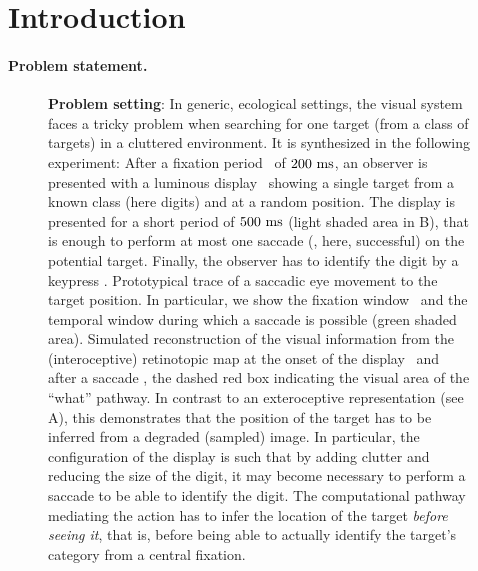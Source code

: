 \section{Introduction}
\label{sec:intro}
\paragraph{Problem statement.}
\begin{figure}[t!]%
	\caption{%
		{\bf Problem setting}: In generic, ecological settings, the visual system faces a tricky problem when searching for one target (from a class of targets) in a cluttered environment. It is synthesized in the following experiment: %
		\A After a fixation period \FIX\ of $200~\si{\milli\second}$, an observer is presented with a luminous display \DIS\ showing a single target from a known class (here digits) and at a random position. The display is presented for a short period of $500~\si{\milli\second}$ (light shaded area in B), that is enough to perform at most one saccade (\SAC , here, successful) on the potential target. Finally, the observer has to identify the digit by a keypress \ANS . %
		\B Prototypical trace of a saccadic eye movement to the target position. In particular, we show the fixation window \FIX\ and the temporal window during which a saccade is possible (green shaded area). %
		\C Simulated reconstruction of the visual information from the (interoceptive) retinotopic map at the onset of the display \DIS\ and after a saccade \SAC , the dashed red box indicating the visual area of the ``what'' pathway. In contrast to an exteroceptive representation (see A), this demonstrates that the position of the target has to be inferred from a degraded (sampled) image. In particular, the configuration of the display is such that by adding clutter and reducing the size of the digit, it may become necessary to perform a saccade to be able to identify the digit. The computational pathway mediating the action has to infer the location of the target \emph{before seeing it}, that is, before being able to actually identify the target's category from a central fixation. %
		\label{fig:intro}}%
\end{figure}%

